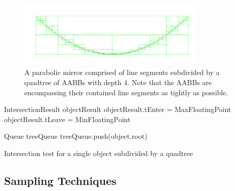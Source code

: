 \documentclass[a4paper,10pt]{article}
\begin{document}
    \begin{center}
        \begin{figure}
            \centering    
            \includegraphics[width=0.8\textwidth]{images/mirror.png}
            \caption{
                A parabolic mirror comprised of line segments
                subdivided by a quadtree of AABBs with depth 4.
                Note that the AABBs are encompassing their contained line
                segments as tightly as possible.
            }
            \label{fig:quadtree}
        \end{figure}
    \end{center}

    \begin{algorithm}
        \label{alg:object_intersect}
        \SetAlgoLined
        IntersectionResult objectResult\;
        objectResult.tEnter = MaxFloatingPoint\;
        objectResult.tLeave = MinFloatingPoint\;

        Queue treeQueue\;
        treeQueue.push(object.root)\;


        \caption{Intersection test for a single object subdivided by a quadtree}
    \end{algorithm}


    \subsection{Sampling Techniques}
\end{document}

